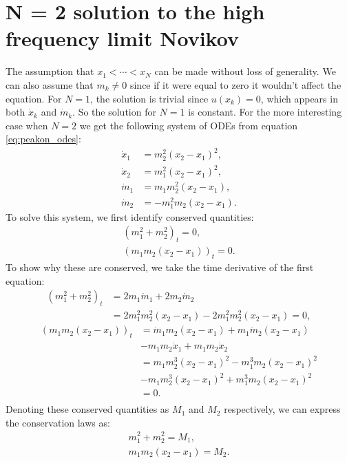 \documentclass[english,master]{liumaiex}
\theoremstyle{plain}
\theoremstyle{definition}
\begin{document}
\section{N = 2 solution to the high frequency limit Novikov}
The assumption that $x_1 < \cdots < x_N$ can be made without loss of generality. We can also assume that $m_k \neq 0$ since if it were equal to zero it wouldn't affect the equation. For $N = 1$, the solution is trivial since $u(x_k) = 0$, which appears in both $\dot{x}_k$ and $\dot{m}_k$. So the solution for $N=1$ is constant. For the more interesting case when $N = 2$ we get the following system of ODEs from equation \eqref{eq:peakon_odes}:
%
\begin{align}
	\dot{x}_1 & = m_2^2 (x_2 - x_1)^2, \\
	\dot{x}_2 & = m_1^2 (x_2 - x_1)^2, \\
	\dot{m}_1 & = m_1 m_2^2(x_2 - x_1),  \\
	\dot{m}_2 & = -m_1^2 m_2(x_2 - x_1).
\end{align}
%
To solve this system, we first identify conserved quantities:
\begin{align}
	(m_1^2 + m_2^2)_t = 0, \\
	(m_1m_2(x_2 - x_1))_t = 0.
\end{align}
%
To show why these are conserved, we take the time derivative of the first equation:
\begin{equation}
\begin{aligned}
	(m_1^2 + m_2^2)_t 
	&= 2m_1\dot{m}_1 + 2m_2\dot{m}_2 \\
	&= 2m_1^2m_2^2(x_2 - x_1) - 2m_1^2m_2^2(x_2 - x_1) = 0,
\end{aligned}
\end{equation}
\begin{equation}
\begin{aligned}
	(m_1m_2(x_2 - x_1))_t 
	&= \dot{m}_1m_2(x_2 - x_1) + m_1\dot{m}_2(x_2 - x_1) \\
	&- m_1m_2\dot{x}_1 + m_1m_2\dot{x}_2 \\
	&= m_1m_2^3(x_2 - x_1)^2 - m_1^3m_2(x_2 - x_1)^2 \\
	&- m_1m_2^3(x_2 - x_1)^2 + m_1^3m_2(x_2 - x_1)^2 \\
	&= 0. \\
\end{aligned}
\end{equation}
%
Denoting these conserved quantities as $M_1$ and $M_2$ respectively, we can express the conservation laws as:
\begin{align}
	m_1^2 + m_2^2 = M_1, \\
	m_1m_2(x_2 - x_1) = M_2.
\end{align}
\end{document}
